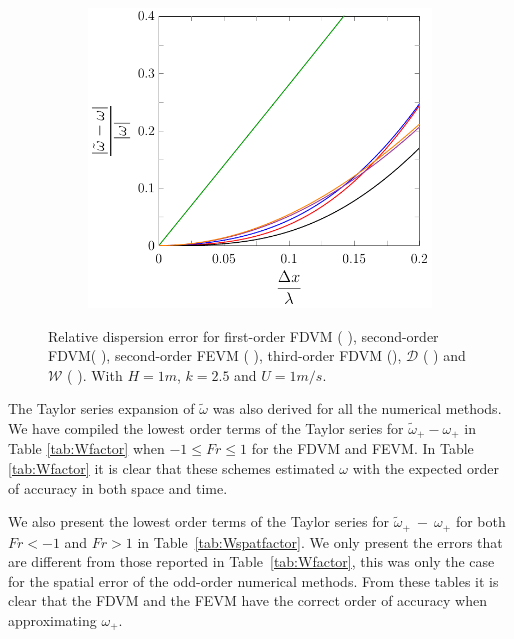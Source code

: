\begin{figure}
\begin{subfigure}{0.5\textwidth}
	\end{subfigure}
	\par\bigskip
	\begin{subfigure}{0.5\textwidth}
		\includegraphics[width=\textwidth]{./chp4/figures/New/Dispu1Fill.pdf}
	\end{subfigure}
	\caption{Relative dispersion error for first-order FDVM ({\color{green!60!black} \solidrule}), second-order FDVM({\color{red} \solidrule}), second-order FEVM ({\color{blue} \solidrule}), third-order FDVM ({\solidrule}), $\mathcal{D}$ ({\color{violet!80!white} \solidrule}) and $\mathcal{W}$ ({\color{orange} \solidrule}). With $H = 1m$, $k = 2.5$ and $U = 1m/s$.}
	\label{fig:Dispu1Fill}
\end{figure}


The Taylor series expansion of $\widetilde{\omega}$ was also derived for all the numerical methods. We have compiled the lowest order terms of the Taylor series for $\widetilde{\omega}_+-\omega_+$ in Table \ref{tab:Wfactor} when $ -1 \le Fr \le 1$ for the FDVM and FEVM. In Table \ref{tab:Wfactor} it is clear that these schemes estimated $\omega$ with the expected order of accuracy in both space and time.

We also present the lowest order terms of the Taylor series for $\widetilde{\omega}_+~-~\omega_+$ for both $ Fr < -1$ and $ Fr > 1$ in Table~\ref{tab:Wspatfactor}. We only present the errors that are different from those reported in Table~\ref{tab:Wfactor}, this was only the case for the spatial error of the odd-order numerical methods.  From these tables it is clear that the FDVM and the FEVM have the correct order of accuracy when approximating $\omega_+$. 

